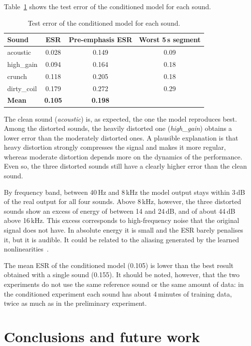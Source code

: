 \documentclass[ENG]{TFUOC}%
\begin{document}
Table~\ref{tab:multi} shows the test error of the conditioned model for each sound.

\begin{table}[H]
\centering
\caption{Test error of the conditioned model for each sound.}
\label{tab:multi}
\small
\begin{tabular}{lccc}
\toprule
\textbf{Sound} & \textbf{ESR} & \textbf{Pre-emphasis ESR} & \textbf{Worst 5\,s segment} \\
\midrule
acoustic & 0.028 & 0.149 & 0.09 \\
high\_gain & 0.094 & 0.164 & 0.18 \\
crunch & 0.118 & 0.205 & 0.18 \\
dirty\_coil & 0.179 & 0.272 & 0.29 \\
\midrule
\textbf{Mean} & \textbf{0.105} & \textbf{0.198} & \\
\bottomrule
\end{tabular}
\end{table}

The clean sound (\emph{acoustic}) is, as expected, the one the model reproduces best. Among the distorted sounds, the heavily distorted one (\emph{high\_gain}) obtains a lower error than the moderately distorted ones. A plausible explanation is that heavy distortion strongly compresses the signal and makes it more regular, whereas moderate distortion depends more on the dynamics of the performance. Even so, the three distorted sounds still have a clearly higher error than the clean sound.

By frequency band, between 40\,Hz and 8\,kHz the model output stays within 3\,dB of the real output for all four sounds. Above 8\,kHz, however, the three distorted sounds show an excess of energy of between 14 and 24\,dB, and of about 44\,dB above 16\,kHz. This excess corresponds to high-frequency noise that the original signal does not have. In absolute energy it is small and the ESR barely penalises it, but it is audible. It could be related to the aliasing generated by the learned nonlinearities~\cite{carson2025}.

The mean ESR of the conditioned model (0.105) is lower than the best result obtained with a single sound (0.155). It should be noted, however, that the two experiments do not use the same reference sound or the same amount of data: in the conditioned experiment each sound has about 4\,minutes of training data, twice as much as in the preliminary experiment.

\chapter{Conclusions and future work}
\end{document}
